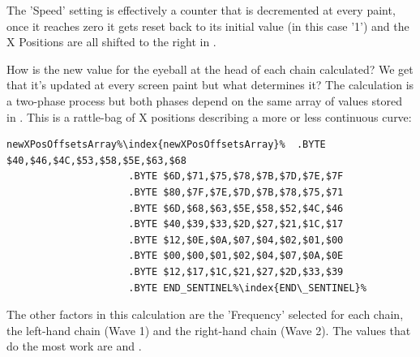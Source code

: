 The 'Speed' setting is effectively a counter that is decremented at every paint, once it reaches zero it gets reset back to 
its initial value (in this case '1') and the X Positions are all shifted to the right in .

How is the new value for the eyeball at the head of each chain calculated? We get that it's updated at every screen paint
but what determines it? The calculation is a two-phase process but both phases depend on the same array of values stored
in . This is a rattle-bag of X positions describing a more or less continuous curve:

\begin{lstlisting}[escapechar=\%,caption=Notice that the values start at \icode{\$40}\, rise gradually to \icode{\$80}\, back to \icode{\$00} and then
back up to \icode{\$40} again.]
newXPosOffsetsArray%\index{newXPosOffsetsArray}%  .BYTE $40,$46,$4C,$53,$58,$5E,$63,$68
                     .BYTE $6D,$71,$75,$78,$7B,$7D,$7E,$7F
                     .BYTE $80,$7F,$7E,$7D,$7B,$78,$75,$71
                     .BYTE $6D,$68,$63,$5E,$58,$52,$4C,$46
                     .BYTE $40,$39,$33,$2D,$27,$21,$1C,$17
                     .BYTE $12,$0E,$0A,$07,$04,$02,$01,$00
                     .BYTE $00,$00,$01,$02,$04,$07,$0A,$0E
                     .BYTE $12,$17,$1C,$21,$27,$2D,$33,$39
                     .BYTE END_SENTINEL%\index{END\_SENTINEL}%
\end{lstlisting}

The other factors in this calculation are the 'Frequency' selected for each chain, the left-hand chain (Wave 1) and the right-hand
chain (Wave 2). The values that do the most work are  and . 

